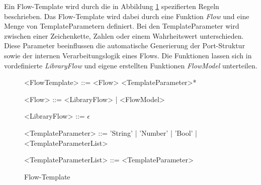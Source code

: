 \documentclass{article}
\begin{document}
    Ein Flow-Template wird durch die in Abbildung \ref{Flow-Template} spezifierten Regeln beschrieben.
    Das Flow-Template wird dabei durch eine Funktion \textit{Flow} und eine Menge von TemplateParametern definiert. 
    Bei den TemplateParameter wird zwischen einer Zeichenkette, Zahlen oder einem Wahrheitswert unterschieden. 
    Diese Parameter beeinflussen die automatische Generierung der Port-Struktur sowie der internen Verarbeitungslogik eines Flows. \cite{99}
    Die Funktionen lassen sich in vordefinierte \textit{LibraryFlow} und eigene erstellten Funktionen \textit{FlowModel} unterteilen.\\
    \begin{figure}
        \begin{grammar}
            <FlowTemplate> ::= <Flow> <TemplateParameter>*

            <Flow> ::= <LibraryFlow> | <FlowModel>
            
            <LibraryFlow> ::= $\epsilon$

            <TemplateParameter> ::= 'String' | 'Number' | 'Bool' | <TemplateParameterList>
            
            <TemplateParameterList> ::= <TemplateParameter>
        \end{grammar}
        \caption{Flow-Template}
        \label{Flow-Template}
    \end{figure}
\end{document}
